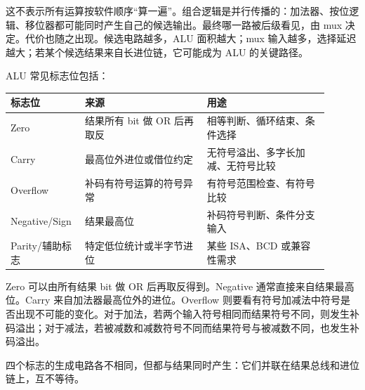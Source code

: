 这不表示所有运算按软件顺序“算一遍”。组合逻辑是并行传播的：加法器、按位逻辑、移位器都可能同时产生自己的候选输出。最终哪一路被后级看见，由 mux 决定。代价也随之出现。候选电路越多，ALU 面积越大；mux 输入越多，选择延迟越大；若某个候选结果来自长进位链，它可能成为 ALU 的关键路径。

ALU 常见标志位包括：

\begin{longtable}{L{0.18\linewidth}L{0.36\linewidth}L{0.36\linewidth}}
\toprule
标志位 & 来源 & 用途 \\
\midrule
Zero & 结果所有 bit 做 OR 后再取反 & 相等判断、循环结束、条件选择 \\
Carry & 最高位外进位或借位约定 & 无符号溢出、多字长加减、无符号比较 \\
Overflow & 补码有符号运算的符号异常 & 有符号范围检查、有符号比较 \\
Negative/Sign & 结果最高位 & 补码符号判断、条件分支输入 \\
Parity/辅助标志 & 特定低位统计或半字节进位 & 某些 ISA、BCD 或兼容性需求 \\
\bottomrule
\end{longtable}

Zero 可以由所有结果 bit 做 OR 后再取反得到。Negative 通常直接来自结果最高位。Carry 来自加法器最高位外的进位。Overflow 则要看有符号加减法中符号是否出现不可能的变化。对于加法，若两个输入符号相同而结果符号不同，则发生补码溢出；对于减法，若被减数和减数符号不同而结果符号与被减数不同，也发生补码溢出。

四个标志的生成电路各不相同，但都与结果同时产生：它们并联在结果总线和进位链上，互不等待。

